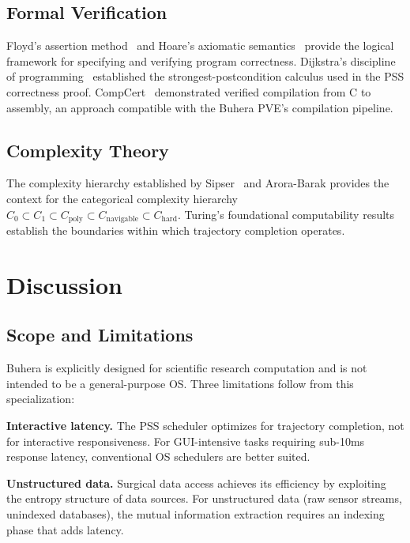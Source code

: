 \documentclass[12pt,twocolumn]{article}
\begin{document}
\subsection{Formal Verification}

Floyd's assertion method~\cite{floyd1967assigning} and Hoare's axiomatic semantics~\cite{hoare1969axiomatic} provide the logical framework for specifying and verifying program correctness. Dijkstra's discipline of programming~\cite{dijkstra1976discipline} established the strongest-postcondition calculus used in the PSS correctness proof. CompCert~\cite{leroy2009formal} demonstrated verified compilation from C to assembly, an approach compatible with the Buhera PVE's compilation pipeline.

\subsection{Complexity Theory}

The complexity hierarchy established by Sipser~\cite{sipser2012introduction} and Arora-Barak provides the context for the categorical complexity hierarchy $C_0 \subset C_1 \subset C_{\text{poly}} \subset C_{\text{navigable}} \subset C_{\text{hard}}$. Turing's foundational computability results~\cite{turing1936computable} establish the boundaries within which trajectory completion operates.

\section{Discussion}
\label{sec:discussion}

\subsection{Scope and Limitations}

Buhera is explicitly designed for scientific research computation and is not intended to be a general-purpose OS. Three limitations follow from this specialization:

\textbf{Interactive latency.} The PSS scheduler optimizes for trajectory completion, not for interactive responsiveness. For GUI-intensive tasks requiring sub-10ms response latency, conventional OS schedulers are better suited.

\textbf{Unstructured data.} Surgical data access achieves its efficiency by exploiting the entropy structure of data sources. For unstructured data (raw sensor streams, unindexed databases), the mutual information extraction requires an indexing phase that adds latency.
\end{document}
